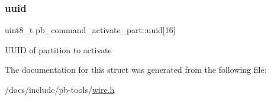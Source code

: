 \subsubsection{\texorpdfstring{uuid}{uuid}}
{\footnotesize\ttfamily uint8\+\_\+t pb\+\_\+command\+\_\+activate\+\_\+part\+::uuid\mbox{[}16\mbox{]}}

U\+U\+ID of partition to activate 

The documentation for this struct was generated from the following file\+:\begin{DoxyCompactItemize}
\item 
/docs/include/pb-\/tools/\hyperlink{wire_8h}{wire.\+h}\end{DoxyCompactItemize}
